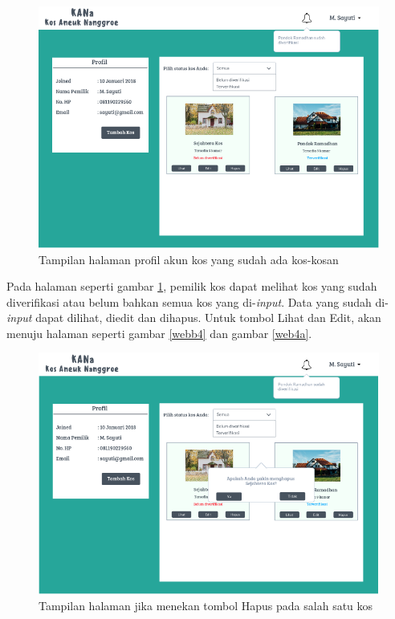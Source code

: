 \begin{enumerate}[a.]
	\begin{figure}[H]
		\centering
		\includegraphics[scale=0.5]{gambar/web5}
		\caption{Tampilan halaman profil akun kos yang sudah ada kos-kosan}
		\label{webb5}
	\end{figure}
	
Pada halaman seperti gambar \ref{webb5}, pemilik kos dapat melihat kos yang sudah diverifikasi atau belum bahkan semua kos yang di-\textit{input}. Data yang sudah di-\textit{input} dapat dilihat, diedit dan dihapus. Untuk tombol Lihat dan Edit, akan menuju halaman seperti gambar \ref{webb4} dan gambar \ref{web4a}.
	
	\begin{figure}[H]
		\centering
		\includegraphics[scale=0.5]{gambar/web7}
		\caption{Tampilan halaman jika menekan tombol Hapus pada salah satu kos}
		\label{webb7}
	\end{figure}
	

\end{enumerate}
